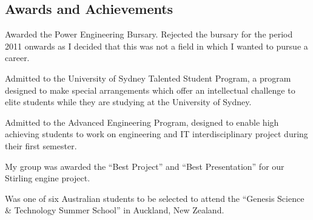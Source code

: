 \subsection*{Awards and Achievements}
\begin{achievements}

{Awarded the  Power Engineering Bursary.
Rejected the bursary for the period 2011 onwards as I decided that this was not
a field in which I wanted to pursue a career.}

{Admitted to the University of Sydney Talented Student Program, a program
designed to make special arrangements which offer an intellectual challenge to
elite students while they are studying at the University of Sydney.}

{Admitted to the  Advanced Engineering
Program, designed to enable high achieving students to work on engineering and
IT interdisciplinary project during their first semester.

My group was awarded the ``Best Project'' and ``Best Presentation'' for our
Stirling engine project.}

{Was one of six Australian students to be selected to attend the ``Genesis
Science \& Technology Summer School'' in Auckland, New Zealand.}

\end{achievements}
